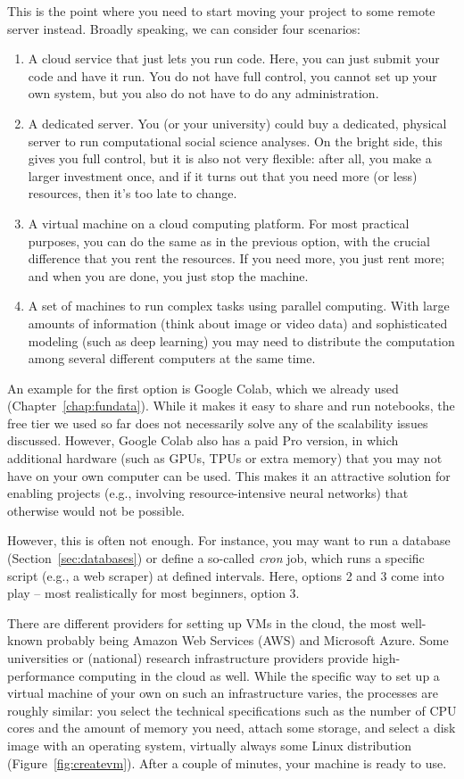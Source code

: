 This is the point where you need to start moving your project to some
remote server instead. Broadly speaking, we can consider four
scenarios:
\begin{enumerate}
\item A cloud service that just lets you run code. Here, you can just
  submit your code and have it run. You do not have full control, you
  cannot set up your own system, but you also do not have to do any
  administration.
\item A dedicated server. You (or your university) could buy a
  dedicated, physical server to run computational social science
  analyses. On the bright side, this gives you full control, but it is
  also not very flexible: after all, you make a larger investment
  once, and if it turns out that you need more (or less) resources,
  then it's too late to change.
\item A virtual machine on a cloud computing platform. For most
  practical purposes, you can do the same as in the previous option,
  with the crucial difference that you rent the resources. If you need
  more, you just rent more; and when you are done, you just stop the
  machine.
\item A set of machines to run complex tasks using parallel computing. With large amounts of information (think about image or video data) and sophisticated modeling (such as deep learning) you may need to distribute the computation among several different computers at the same time.
\end{enumerate}

An example for the first option is Google Colab, which we already used
(Chapter~\ref{chap:fundata}). While it makes it easy to share and run notebooks,
the free tier we used so far does not necessarily solve any of the
scalability issues discussed. However, Google Colab also has a paid Pro
version, in which additional hardware (such as GPUs, TPUs or extra memory)
that you may not have on your own computer can be used. This makes
it an attractive solution for enabling projects (e.g., involving
resource-intensive neural networks) that otherwise would not be possible.

However, this is often not enough. For instance, you may want to run
a database (Section~\ref{sec:databases}) or define a so-called \emph{cron} job,
which runs a specific script (e.g., a web scraper) at defined intervals.
Here, options 2 and 3 come into play -- most realistically for most
beginners, option 3.

There are different providers for setting up VMs in the cloud, the
most well-known probably being Amazon Web Services (AWS) and
Microsoft Azure. Some universities or (national) research infrastructure
providers provide high-performance computing in the cloud as well.
While the specific way to set up a virtual machine of your own on
such an infrastructure varies, the processes are roughly similar:
you select the technical specifications such as the number of CPU
cores and the amount of memory you need, attach some storage, and
select a disk image with an operating system, virtually always some
Linux distribution (Figure~\ref{fig:createvm}).
After a couple of minutes, your machine is ready to use.

